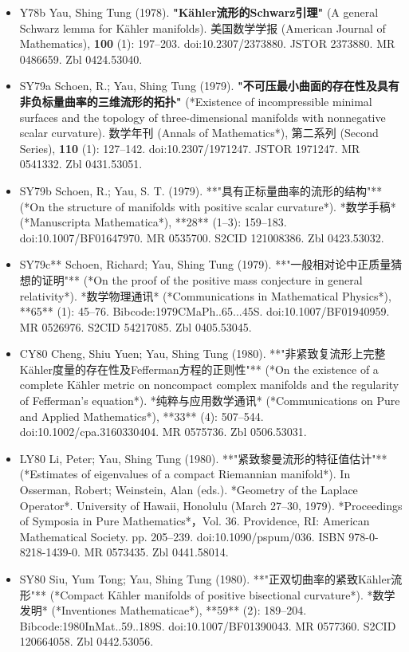 \begin{itemize}
\item Y78b Yau, Shing Tung (1978). \textbf{"Kähler流形的Schwarz引理"} (A general Schwarz lemma for Kähler manifolds). 美国数学学报 (American Journal of Mathematics), \textbf{100} (1): 197–203. doi:10.2307/2373880. JSTOR 2373880. MR 0486659. Zbl 0424.53040.
\item SY79a  Schoen, R.; Yau, Shing Tung (1979). \textbf{"不可压最小曲面的存在性及具有非负标量曲率的三维流形的拓扑"} (*Existence of incompressible minimal surfaces and the topology of three-dimensional manifolds with nonnegative scalar curvature). 数学年刊 (Annals of Mathematics*), 第二系列 (Second Series), \textbf{110} (1): 127–142. doi:10.2307/1971247. JSTOR 1971247. MR 0541332. Zbl 0431.53051.
\item SY79b  Schoen, R.; Yau, S. T. (1979). **"具有正标量曲率的流形的结构"** (*On the structure of manifolds with positive scalar curvature*). *数学手稿* (*Manuscripta Mathematica*), **28** (1–3): 159–183. doi:10.1007/BF01647970. MR 0535700. S2CID 121008386. Zbl 0423.53032.

\item SY79c**  
  Schoen, Richard; Yau, Shing Tung (1979). **"一般相对论中正质量猜想的证明"** (*On the proof of the positive mass conjecture in general relativity*). *数学物理通讯* (*Communications in Mathematical Physics*), **65** (1): 45–76. Bibcode:1979CMaPh..65...45S. doi:10.1007/BF01940959. MR 0526976. S2CID 54217085. Zbl 0405.53045.
\item CY80 Cheng, Shiu Yuen; Yau, Shing Tung (1980). **"非紧致复流形上完整Kähler度量的存在性及Fefferman方程的正则性"** (*On the existence of a complete Kähler metric on noncompact complex manifolds and the regularity of Fefferman's equation*). *纯粹与应用数学通讯* (*Communications on Pure and Applied Mathematics*), **33** (4): 507–544. doi:10.1002/cpa.3160330404. MR 0575736. Zbl 0506.53031.
\item LY80 Li, Peter; Yau, Shing Tung (1980). **"紧致黎曼流形的特征值估计"** (*Estimates of eigenvalues of a compact Riemannian manifold*). In Osserman, Robert; Weinstein, Alan (eds.). *Geometry of the Laplace Operator*. University of Hawaii, Honolulu (March 27–30, 1979). *Proceedings of Symposia in Pure Mathematics*，Vol. 36. Providence, RI: American Mathematical Society. pp. 205–239. doi:10.1090/pspum/036. ISBN 978-0-8218-1439-0. MR 0573435. Zbl 0441.58014.
\item SY80 Siu, Yum Tong; Yau, Shing Tung (1980). **"正双切曲率的紧致Kähler流形"** (*Compact Kähler manifolds of positive bisectional curvature*). *数学发明* (*Inventiones Mathematicae*), **59** (2): 189–204. Bibcode:1980InMat..59..189S. doi:10.1007/BF01390043. MR 0577360. S2CID 120664058. Zbl 0442.53056.
\end{itemize}